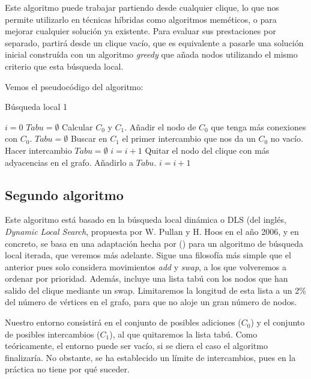 Este algoritmo puede trabajar partiendo desde cualquier clique, lo que nos permite utilizarlo en técnicas
híbridas como algoritmos meméticos, o para mejorar cualquier solución ya existente. Para evaluar
sus prestaciones por separado, partirá desde un clique vacío, que es equivalente a pasarle una solución
inicial construída con un algoritmo \textit{greedy} que añada nodos utilizando el mismo criterio que esta
búsqueda local.

Vemos el pseudocódigo del algoritmo:

\begin{algorithm}[H]
\caption{Búsqueda local 1}
  \begin{algorithmic}
    \State $i = 0$
    \State $Tabu = \emptyset$
    \State Calcular $C_0$ y $C_1$.
    \Repeat
        \State Añadir el nodo de $C_0$ que tenga más conexiones con $C_0$.
        \State $Tabu = \emptyset$
      \Else
        \State Buscar en $C_1$ el primer intercambio que nos da un $C_0$ no vacío.
          \State Hacer intercambio
          \State $Tabu = \emptyset$
          \State $i = i + 1$
        \Else
          \State Quitar el nodo del clique con más adyacencias en el grafo.
          \State Añadirlo a $Tabu$.
          \State $i = i + 1$
        \EndIf
      \EndIf
  \end{algorithmic}
\end{algorithm}

\subsection{Segundo algoritmo}

Este algoritmo está basado en la búsqueda local dinámica o DLS (del inglés, \textit{Dynamic Local Search},
propuesta por W. Pullan y H. Hoos en el año 2006, y en concreto, se basa en una adaptación hecha
por () para un algoritmo de búsqueda local iterada, que veremos más adelante.
Sigue una filosofía más simple que el anterior pues solo considera movimientos \textit{add}
y \textit{swap}, a los que volveremos a ordenar por prioridad. Además, incluye una lista
tabú con los nodos que han salido del clique mediante un swap. Limitaremos la longitud de esta
lista a un 2\% del número de vértices en el grafo, para que no aloje un gran número de nodos.

Nuestro entorno consistirá en el conjunto de posibles adiciones ($C_0$) y el conjunto de
posibles intercambios ($C_1$), al que quitaremos la lista tabú. Como teóricamente, el entorno
puede ser vacío, si se diera el caso el algoritmo finalizaría. No obstante, se ha establecido un
límite de intercambios, pues en la práctica no tiene por qué suceder.

